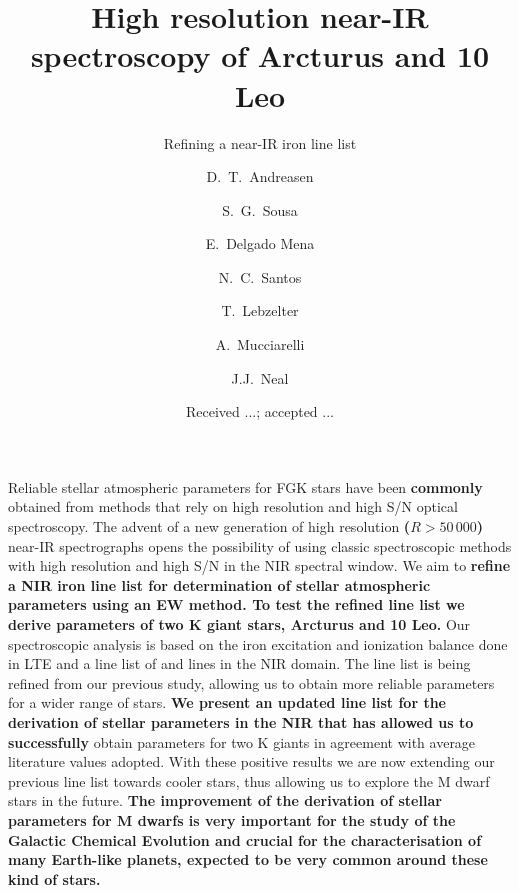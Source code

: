 \documentclass{aa}
\begin{document}
\title{High resolution near-IR spectroscopy of Arcturus and 10 Leo}
\subtitle{Refining a near-IR iron line list}


\author{ D.~T.~Andreasen
    \and S.~G.~Sousa
    \and E.~Delgado Mena
    \and N.~C.~Santos
    \and T.~Lebzelter
    \and A.~Mucciarelli
    \and J.J.~Neal}







\date{Received ...; accepted ...}

\abstract
{Reliable stellar atmospheric parameters for FGK stars have been {\bf commonly} obtained from
methods that rely on high resolution and high S/N optical spectroscopy. The advent of a new
generation of high resolution {\bf ($R>50\,000$)} near-IR spectrographs opens the possibility of
using classic spectroscopic methods with high resolution and high S/N in the NIR spectral window.}
{We aim to {\bf refine a NIR iron line list for determination of stellar atmospheric parameters
using an EW method. To test the refined line list we derive parameters of two K giant stars,
Arcturus and 10 Leo.}}
{Our spectroscopic analysis is based on the iron excitation and ionization balance done in LTE and a
line list of  and  lines in the NIR domain. The line list is being refined
from our previous study, allowing us to obtain more reliable parameters for a wider range of stars.}
{{\bf We present an updated line list for the derivation of stellar parameters in the NIR that has
allowed us to successfully} obtain parameters for two K giants in agreement with average literature
values adopted.}
{With these positive results we are now extending our previous line list towards cooler stars, thus
allowing us to explore the M dwarf stars in the future. {\bf The improvement of the derivation of
stellar parameters for M dwarfs is very important for the study of the Galactic Chemical Evolution
and crucial for the characterisation of many Earth-like planets, expected to be very common around
these kind of stars.}}
\end{document}
